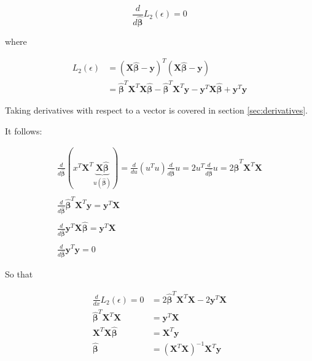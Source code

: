 \begin{equation}
\frac{d}{d\mathbf{\hat{\beta}}}L_2(\epsilon) = 0
\end{equation}

where

\begin{equation}
\begin{array}{rl}
L_2(\epsilon) &= \left(\mathbf{X}\mathbf{\hat{\beta}}-\mathbf{y}\right)^T\left(\mathbf{X}\mathbf{\hat{\beta}}-\mathbf{y}\right)\\
&= \mathbf{\hat{\beta}}^T\mathbf{X}^T\mathbf{X}\mathbf{\hat{\beta}} - \mathbf{\hat{\beta}}^T\mathbf{X}^T\mathbf{y} - \mathbf{y}^T\mathbf{X}\mathbf{\hat{\beta}} + \mathbf{y}^T\mathbf{y}
\end{array}
\end{equation}

Taking derivatives with respect to a vector is covered in section \ref{sec:derivatives}.

It follows:

\begin{equation}
\begin{array}{l}
\frac{d}{d\mathbf{\hat{\beta}}}\left(x^T\mathbf{X}^T\underbrace{\mathbf{X}\mathbf{\hat{\beta}}}_{u(\mathbf{\hat{\beta}})}\right) = \frac{d}{du}\left(u^Tu\right)\frac{d}{d\mathbf{\hat{\beta}}}u = 2u^T\frac{d}{d\mathbf{\hat{\beta}}}u = 2\mathbf{\hat{\beta}}^T\mathbf{X}^T\mathbf{X}\\
\\
\frac{d}{d\mathbf{\hat{\beta}}}\mathbf{\hat{\beta}}^T\mathbf{X}^T\mathbf{y} = \mathbf{y}^T\mathbf{X}\\
\\
\frac{d}{d\mathbf{\hat{\beta}}}\mathbf{y}^T\mathbf{X}\mathbf{\hat{\beta}} = \mathbf{y}^T\mathbf{X}\\
\\
\frac{d}{d\mathbf{\hat{\beta}}}\mathbf{y}^T\mathbf{y} = 0
\end{array}
\end{equation}

So that

\begin{equation}
\begin{array}{rl}
\frac{d}{dx}L_2(\epsilon) = 0 &= 2\mathbf{\hat{\beta}}^T\mathbf{X}^T\mathbf{X} - 2\mathbf{y}^T\mathbf{X}\\
\mathbf{\hat{\beta}}^T\mathbf{X}^T\mathbf{X} &= \mathbf{y}^T\mathbf{X}\\
\mathbf{X}^T\mathbf{X}\mathbf{\hat{\beta}} &= \mathbf{X}^T\mathbf{y}\\
\mathbf{\hat{\beta}} &= \left(\mathbf{X}^T\mathbf{X}\right)^{-1}\mathbf{X}^T\mathbf{y}
\end{array}
\end{equation}



